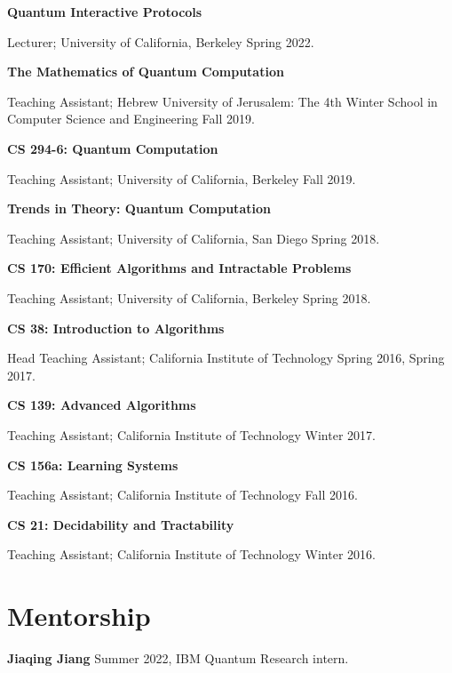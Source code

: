 \documentclass[11pt]{article}
\begin{document}
\textbf{Quantum Interactive Protocols}

Lecturer; University of California, Berkeley Spring 2022.

\textbf{The Mathematics of Quantum Computation}

Teaching Assistant; Hebrew University of Jerusalem: The 4th Winter School in Computer Science and Engineering Fall 2019.

\textbf{CS 294-6: Quantum Computation}

Teaching Assistant; University of California, Berkeley Fall 2019.

\textbf{Trends in Theory: Quantum Computation}

Teaching Assistant; University of California, San Diego Spring 2018.

\textbf{CS 170: Efficient Algorithms and Intractable Problems}

Teaching Assistant; University of California, Berkeley Spring 2018.

\textbf{CS 38: Introduction to Algorithms}

Head Teaching Assistant; California Institute of Technology Spring 2016, Spring 2017.

\textbf{CS 139: Advanced Algorithms}

Teaching Assistant; California Institute of Technology Winter 2017.

\textbf{CS 156a: Learning Systems}

Teaching Assistant; California Institute of Technology Fall 2016.

\textbf{CS 21: Decidability and Tractability}

Teaching Assistant; California Institute of Technology Winter 2016.




\section{Mentorship}

\textbf{Jiaqing Jiang}
Summer 2022,
IBM Quantum Research intern.
\end{document}
